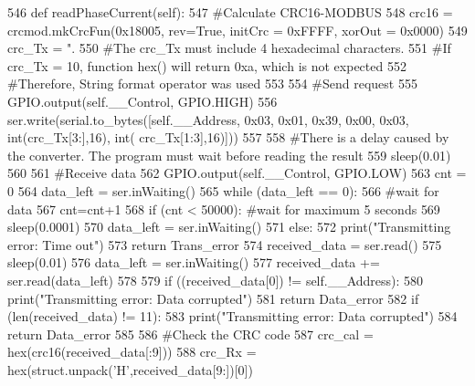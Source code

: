 \begin{DoxyCode}
546     \textcolor{keyword}{def }readPhaseCurrent(self):
547         \textcolor{comment}{#Calculate CRC16-MODBUS
}
548         crc16 = crcmod.mkCrcFun(0x18005, rev=\textcolor{keyword}{True}, initCrc = 0xFFFF, xorOut = 0x0000)
549         crc\_Tx = \textcolor{stringliteral}{".%
550         \textcolor{comment}{#The crc\_Tx must include 4 hexadecimal characters.
}
551         \textcolor{comment}{#If crc\_Tx =  10, function hex() will return 0xa, which is not expected
}
552         \textcolor{comment}{#Therefore, String format operator was used
}
553     
554         \textcolor{comment}{#Send request
}
555         GPIO.output(self.\_\_Control, GPIO.HIGH)
556         ser.write(serial.to\_bytes([self.\_\_Address, 0x03, 0x01, 0x39, 0x00, 0x03, int(crc\_Tx[3:],16), int(
      crc\_Tx[1:3],16)]))
557     
558         \textcolor{comment}{#There is a delay caused by the converter. The program must wait before reading the result
}
559         sleep(0.01)
560     
561         \textcolor{comment}{#Receive data
}
562         GPIO.output(self.\_\_Control, GPIO.LOW)
563         cnt = 0
564         data\_left = ser.inWaiting()
565         \textcolor{keywordflow}{while} (data\_left == 0):
566             \textcolor{comment}{#wait for data
}
567             cnt=cnt+1
568             \textcolor{keywordflow}{if} (cnt < 50000): \textcolor{comment}{#wait for maximum 5 seconds
}
569                 sleep(0.0001)
570                 data\_left = ser.inWaiting()
571             \textcolor{keywordflow}{else}:
572                 print(\textcolor{stringliteral}{"Transmitting error: Time out"})
573                 \textcolor{keywordflow}{return} Trans\_error
574         received\_data = ser.read()
575         sleep(0.01)
576         data\_left = ser.inWaiting()
577         received\_data += ser.read(data\_left)
578         
579         \textcolor{keywordflow}{if} ((received\_data[0]) != self.\_\_Address):
580             print(\textcolor{stringliteral}{"Transmitting error: Data corrupted"})
581             \textcolor{keywordflow}{return} Data\_error
582         \textcolor{keywordflow}{if} (len(received\_data) != 11):
583             print(\textcolor{stringliteral}{"Transmitting error: Data corrupted"})
584             \textcolor{keywordflow}{return} Data\_error
585     
586         \textcolor{comment}{#Check the CRC code
}
587         crc\_cal = hex(crc16(received\_data[:9]))
588         crc\_Rx = hex(struct.unpack(\textcolor{stringliteral}{'H'},received\_data[9:])[0])
}
\end{DoxyCode}

